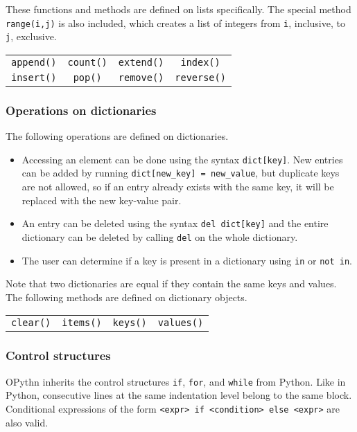 \documentclass[11pt, twoside]{article}
\newcommand{\ms}{\texttt}
\begin{document}
    These functions and methods are defined on lists specifically. The special method \ms{range(i,j)} is also included, which creates a list of integers from \ms{i}, inclusive, to \ms{j}, exclusive.
    \begin{center}
        \begin{tabular}{cccc}
            \ms{append()} & \ms{count()} & \ms{extend()} & \ms{index()}\\
            \ms{insert()} & \ms{pop()} & \ms{remove()} & \ms{reverse()}\\
    \end{tabular}
    \end{center}

    \subsubsection{Operations on dictionaries}
    The following operations are defined on dictionaries.
    \begin{itemize}
        \item Accessing an element can be done using the syntax \ms{dict[key]}. New entries can be added by running \ms{dict[new\_key] = new\_value}, but duplicate keys are not allowed, so if an entry already exists with the same key, it will be replaced with the new key-value pair.
        \item An entry can be deleted using the syntax \ms{del dict[key]} and the entire dictionary can be deleted by calling \ms{del} on the whole dictionary.
        \item The user can determine if a key is present in a dictionary using \ms{in} or \ms{not in}.
    \end{itemize}
    Note that two dictionaries are equal if they contain the same keys and values. The following methods are defined on dictionary objects.
    \begin{center}
        \begin{tabular}{cccc}
            \ms{clear()} & \ms{items()} & \ms{keys()} & \ms{values()}\\
    \end{tabular}
    \end{center}

    \subsubsection{Control structures}
    OPythn inherits the control structures \ms{if}, \ms{for}, and \ms{while} from Python. Like in Python, consecutive lines at the same indentation level belong to the same block. Conditional expressions of the form \ms{<expr> if <condition> else <expr>} are also valid.
\end{document}
